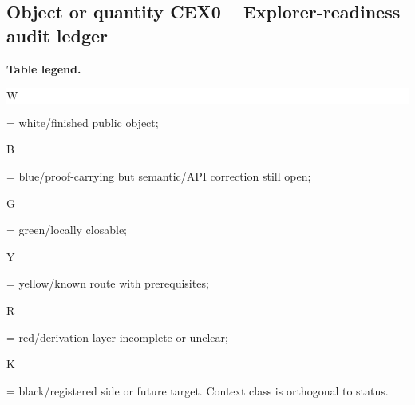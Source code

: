 \subsection*{Object or quantity CEX0 -- Explorer-readiness audit ledger}
\hypertarget{objproof:CEX0}{}
\par\smallskip\noindent\begin{minipage}{0.99\linewidth}\footnotesize\raggedright\textbf{Table legend.} \colorbox{white}{\strut W} = white/finished public object; \colorbox{cyan!20}{\strut B} = blue/proof-carrying but semantic/API correction still open; \colorbox{green!18}{\strut G} = green/locally closable; \colorbox{yellow!25}{\strut Y} = yellow/known route with prerequisites; \colorbox{red!20}{\strut R} = red/derivation layer incomplete or unclear; \colorbox{black!18}{\strut K} = black/registered side or future target. Context class is orthogonal to status.\end{minipage}\par\vspace{0.25em}
